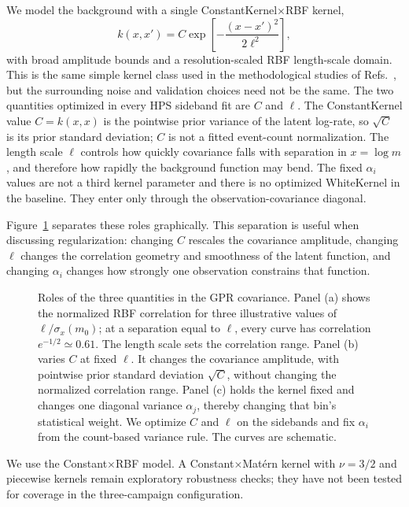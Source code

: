 We model the background with a single ConstantKernel$\times$RBF kernel,
\begin{equation}
k(x,x') = C \exp\!\left[-\frac{(x-x')^2}{2\ell^2}\right],
\end{equation}
with broad amplitude bounds and a resolution-scaled RBF length-scale domain. This is
the same simple kernel class used in the methodological studies of
Refs.~\cite{Gandrakota2023,BarrLiu2025}, but the surrounding noise and validation
choices need not be the same. The two quantities optimized in every HPS sideband fit
are $C$ and $\ell$. The ConstantKernel value $C=k(x,x)$ is the pointwise prior
variance of the latent log-rate, so $\sqrt{C}$ is its prior standard deviation; $C$
is not a fitted event-count normalization. The length scale $\ell$ controls how
quickly covariance falls with separation in $x=\log m$, and therefore how rapidly
the background function may bend. The fixed $\alpha_i$ values are not a third kernel
parameter and there is no optimized WhiteKernel in the baseline. They enter only
through the observation-covariance diagonal.

Figure~\ref{fig:gpr-hyperparameter-roles} separates these roles graphically. This
separation is useful when discussing regularization: changing $C$ rescales the
covariance amplitude, changing $\ell$ changes the correlation geometry and smoothness
of the latent function, and changing $\alpha_i$ changes how strongly one observation
constrains that function.

\begin{figure}[H]
\centering
{}
\caption{Roles of the three quantities in the GPR covariance. Panel (a) shows the
normalized RBF correlation for three illustrative values of
$\ell/\sigma_x(m_0)$; at a separation equal to $\ell$, every curve has correlation
$e^{-1/2}\simeq0.61$. The length scale sets the correlation range. Panel (b) varies
$C$ at fixed $\ell$. It changes the
covariance amplitude, with pointwise prior standard deviation $\sqrt{C}$, without
changing the normalized correlation range. Panel (c) holds the kernel fixed and
changes one diagonal variance $\alpha_j$, thereby changing that bin's statistical
weight. We optimize $C$ and $\ell$ on the sidebands and fix $\alpha_i$ from the
count-based variance rule. The curves are schematic.}
\label{fig:gpr-hyperparameter-roles}
\end{figure}

We use the Constant$\times$RBF model. A Constant$\times$Mat\'ern kernel with
$\nu=3/2$ and piecewise kernels remain exploratory robustness checks; they have not
been tested for coverage in the three-campaign configuration.

